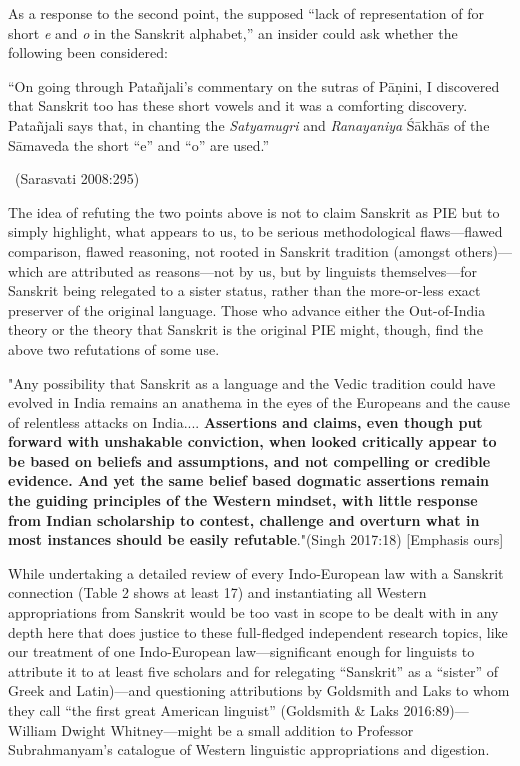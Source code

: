 As a response to the second point, the supposed “lack of representation of for short \textit{e} and \textit{o} in the Sanskrit alphabet,” an insider could ask whether the following been considered:

\begin{myquote}
“On going through Patañjali’s commentary on the sutras of Pāṇini, I discovered that Sanskrit too has these short vowels and it was a comforting discovery. Patañjali says that, in chanting the \textit{Satyamugri} and \textit{Ranayaniya} Śākhās of the Sāmaveda the short “e” and “o” are used.” 

~\hfill (Sarasvati 2008:295)
\end{myquote}

The idea of refuting the two points above is not to claim Sanskrit as PIE but to simply highlight, what appears to us, to be serious methodological flaws—flawed comparison, flawed reasoning, not rooted in Sanskrit tradition (amongst others)—which are attributed as reasons—not by us, but by linguists themselves—for Sanskrit being relegated to a sister status, rather than the more-or-less exact preserver of the original language. Those who advance either the Out-of-India theory or the theory that Sanskrit is the original PIE might, though, find the above two refutations of some use.

\begin{myquote}
"Any possibility that Sanskrit as a language and the Vedic tradition could have evolved in India remains an anathema in the eyes of the Europeans and the cause of relentless attacks on India.... \textbf{Assertions and claims, even though put forward with unshakable conviction, when looked critically appear to be based on beliefs and assumptions, and not compelling or credible evidence. And yet the same belief based dogmatic assertions remain the guiding principles of the Western mindset, with little response from Indian scholarship to contest, challenge and overturn what in most instances should be easily refutable}."\hfill (Singh 2017:18) [Emphasis ours]
\end{myquote}

While undertaking a detailed review of every Indo-European law with a Sanskrit connection (Table 2 shows at least 17) and instantiating all Western appropriations from Sanskrit would be too vast in scope to be dealt with in any depth here that does justice to these full-fledged independent research topics, like our treatment of one Indo-European law—significant enough for linguists to attribute it to at least five scholars and for relegating “Sanskrit” as a “sister” of Greek and Latin)—and questioning attributions by Goldsmith and Laks to whom they call “the first great American linguist” (Goldsmith \& Laks 2016:89)—William Dwight Whitney—might be a small addition to Professor Subrahmanyam’s catalogue of Western linguistic appropriations and digestion.

